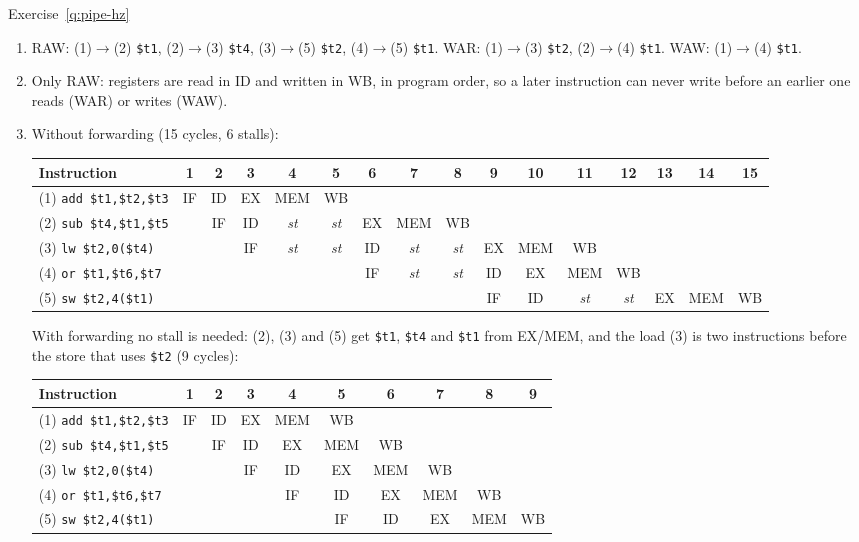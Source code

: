 \begin{noot}{Exercise~\ref{q:pipe-hz}}
\begin{enumerate}[label=(\alph*),leftmargin=*]
  \item RAW: (1)$\to$(2) \texttt{\$t1}, (2)$\to$(3) \texttt{\$t4}, (3)$\to$(5)
  \texttt{\$t2}, (4)$\to$(5) \texttt{\$t1}. WAR: (1)$\to$(3) \texttt{\$t2},
  (2)$\to$(4) \texttt{\$t1}. WAW: (1)$\to$(4) \texttt{\$t1}.
  \item Only RAW: registers are read in ID and written in WB, in program order, so
  a later instruction can never write before an earlier one reads (WAR) or writes
  (WAW).
  \item Without forwarding (15 cycles, 6 stalls):
\begin{center}\scriptsize\setlength{\tabcolsep}{1.6pt}
\begin{tabular}{@{}lccccccccccccccc@{}}
\toprule
Instruction & 1 & 2 & 3 & 4 & 5 & 6 & 7 & 8 & 9 & 10 & 11 & 12 & 13 & 14 & 15 \\
\midrule
(1) \texttt{add \$t1,\$t2,\$t3} & IF & ID & EX & MEM & WB &  &  &  &  &  &  &  &  &  &  \\
(2) \texttt{sub \$t4,\$t1,\$t5} &  & IF & ID & \textit{st} & \textit{st} & EX & MEM & WB &  &  &  &  &  &  &  \\
(3) \texttt{lw \$t2,0(\$t4)} &  &  & IF & \textit{st} & \textit{st} & ID & \textit{st} & \textit{st} & EX & MEM & WB &  &  &  &  \\
(4) \texttt{or \$t1,\$t6,\$t7} &  &  &  &  &  & IF & \textit{st} & \textit{st} & ID & EX & MEM & WB &  &  &  \\
(5) \texttt{sw \$t2,4(\$t1)} &  &  &  &  &  &  &  &  & IF & ID & \textit{st} & \textit{st} & EX & MEM & WB \\
\bottomrule
\end{tabular}
\end{center}
  With forwarding no stall is needed: (2), (3) and (5) get \texttt{\$t1},
  \texttt{\$t4} and \texttt{\$t1} from EX/MEM, and the load (3) is two
  instructions before the store that uses \texttt{\$t2} (9 cycles):
\begin{center}\scriptsize\setlength{\tabcolsep}{1.6pt}
\begin{tabular}{@{}lccccccccc@{}}
\toprule
Instruction & 1 & 2 & 3 & 4 & 5 & 6 & 7 & 8 & 9 \\
\midrule
(1) \texttt{add \$t1,\$t2,\$t3} & IF & ID & EX & MEM & WB &  &  &  &  \\
(2) \texttt{sub \$t4,\$t1,\$t5} &  & IF & ID & EX & MEM & WB &  &  &  \\
(3) \texttt{lw \$t2,0(\$t4)} &  &  & IF & ID & EX & MEM & WB &  &  \\
(4) \texttt{or \$t1,\$t6,\$t7} &  &  &  & IF & ID & EX & MEM & WB &  \\
(5) \texttt{sw \$t2,4(\$t1)} &  &  &  &  & IF & ID & EX & MEM & WB \\
\bottomrule
\end{tabular}
\end{center}
\end{enumerate}
\end{noot}

